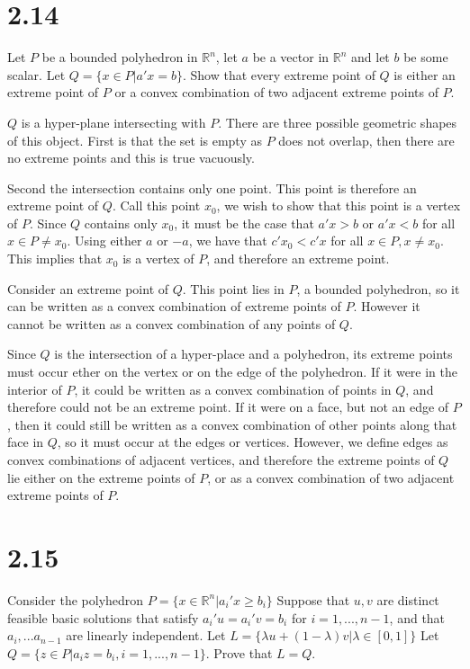 \documentclass[12pt]{paper}
\newcommand{\setR}{ \mathbb{R} }
\begin{document}
\section{2.14}

Let $P$ be a bounded polyhedron in $\setR^n$, let $a$ be a vector in
$\setR^n$ and let $b$ be some scalar. Let $Q = \{ x \in P \vert a'x = b
\}$. Show that every extreme point of $Q$ is either an extreme point
of $P$ or a convex combination of two adjacent extreme points of $P$.

\vspace{.3in}

$Q$ is a hyper-plane intersecting with $P$. There are three possible
geometric shapes of this object. First is that the set is empty as $P$
does not overlap, then there are no extreme points and this is true
vacuously.

Second the intersection contains only one point. This point is
therefore an extreme point of $Q$. Call this point $x_0$, we wish to
show that this point is a vertex of $P$. Since $Q$ contains only
$x_0$, it must be the case that $a'x > b$ or $a'x < b$ for all $x \in P
\neq x_0$. Using either $a$ or $-a$, we have that $c'x_0 < c'x$ for all
$x \in P, x \neq x_0$. This implies that $x_0$ is a vertex of $P$, and
therefore an extreme point.

Consider an extreme point of $Q$. This point lies in $P$, a bounded
polyhedron, so it can be written as a convex combination of extreme
points of $P$. However it cannot be written as a convex combination of
any points of $Q$.

Since $Q$ is the intersection of a hyper-place and a polyhedron, its
extreme points must occur ether on the vertex or on the edge of the
polyhedron. If it were in the interior of $P$, it could be written as
a convex combination of points in $Q$, and therefore could not be an
extreme point. If it were on a face, but not an edge of $P$, then it
could still be written as a convex combination of other points along
that face in $Q$, so it must occur at the edges or vertices. However,
we define edges as convex combinations of adjacent vertices, and
therefore the extreme points of $Q$ lie either on the extreme points
of $P$, or as a convex combination of two adjacent extreme points of
$P$.

\section{2.15}

Consider the polyhedron $P = \{ x \in \setR^n \vert a_i'x \geq b_i\}$ Suppose
that $u,v$ are distinct feasible basic solutions that satisfy
$a_i' u = a_i' v = b_i$ for $i = 1,...,n-1$, and that $a_i,...a_{n-1}$
are linearly independent. Let
$L = \{ \lambda u + (1-\lambda) v \vert \lambda \in [0,1] \}$ Let
$Q = \{ z \in P \vert a_iz = b_i, i = 1,...,n-1\}$.
Prove that $L = Q$.
\end{document}

